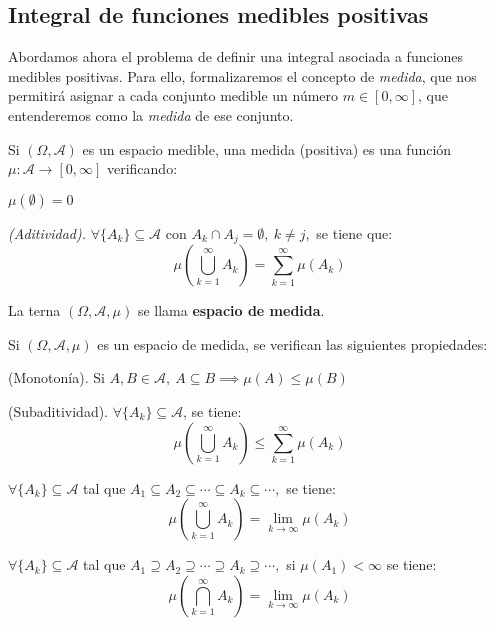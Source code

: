 
\subsection{Integral de funciones medibles positivas}

Abordamos ahora el problema de definir una integral asociada a funciones medibles positivas. Para ello, formalizaremos el concepto de \textit{medida}, que nos permitirá asignar a cada conjunto medible un número $m \in [0,\infty]$, que entenderemos como la \textit{medida} de ese conjunto.

\begin{ndef}[Medida]
  Si $(\Omega, \mathscr A)$ es un espacio medible, una medida (positiva) es una función $\mu: \mathscr A \rightarrow [0, \infty]$ verificando:
  \begin{nlist}
  \item $\mu(\emptyset) = 0$
  \item \textit{(Aditividad).} $\forall \{A_k\} \subseteq \mathscr A$ con $A_k\cap A_j = \emptyset,\ k \neq j,$ se tiene que:
    $$\mu \left( \bigcup_{k=1}^\infty A_k \right) = \sum_{k=1}^\infty \mu(A_k) $$
  \end{nlist}
  La terna $(\Omega, \mathscr A, \mu)$ se llama \textbf{espacio de medida}.
\end{ndef}

\begin{nprop} \label{prop_medida} Si $(\Omega, \mathscr A, \mu)$ es un espacio de medida, se verifican las siguientes propiedades:
  \begin{nlist}
  \item (Monotonía). Si $A,B \in \mathscr A,\ A \subseteq B \implies \mu(A) \leq \mu(B)$
  \item (Subaditividad). $\forall \{A_k\} \subseteq \mathscr A$, se tiene:
    \[
      \mu\left( \bigcup_{k=1}^\infty A_k \right) \leq \sum_{k=1}^\infty \mu(A_k)
    \]
  \item $\forall \{A_k\} \subseteq \mathscr A$ tal que $A_1\subseteq A_2\subseteq \cdots \subseteq A_k \subseteq \cdots,$ se tiene:
    $$\mu \left( \bigcup_{k=1}^\infty A_k \right) = \lim_{k \to \infty}\mu(A_k)$$
  \item $\forall \{A_k\} \subseteq \mathscr A$ tal que $A_1\supseteq A_2\supseteq \cdots \supseteq A_k \supseteq \cdots,$ si $\mu(A_1) < \infty$ se tiene:
    $$\mu \left( \bigcap_{k=1}^\infty A_k \right) = \lim_{k \to \infty}\mu(A_k)$$
  \end{nlist}
\end{nprop}

